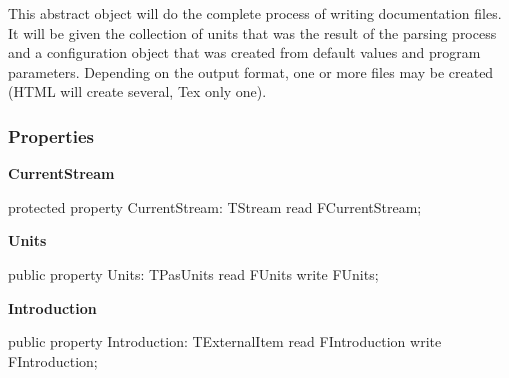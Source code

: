 \documentclass{report}
\newif\ifpdf
\begin{document}
 This abstract object will do the complete process of writing documentation files. It will be given the collection of units that was the result of the parsing process and a configuration object that was created from default values and program parameters. Depending on the output format, one or more files may be created (HTML will create several, Tex only one).\subsubsection*{\large{\textbf{Properties}}\normalsize\hspace{1ex}\hfill}
\begin{list}{}{
\setlength{\itemindent}{0cm}
\setlength{\listparindent}{0cm}
\setlength{\leftmargin}{\evensidemargin}
\addtolength{\leftmargin}{\tmplength}
\settowidth{\labelsep}{X}
\addtolength{\leftmargin}{\labelsep}
\setlength{\labelwidth}{\tmplength}
}
\label{PasDoc_Gen.TDocGenerator-CurrentStream}
\item[\textbf{CurrentStream}\hfill]
\ifpdf
\begin{flushleft}
\fi
\begin{ttfamily}
protected property CurrentStream: TStream read FCurrentStream;\end{ttfamily}

\ifpdf
\end{flushleft}
\fi


\par  \label{PasDoc_Gen.TDocGenerator-Units}
\item[\textbf{Units}\hfill]
\ifpdf
\begin{flushleft}
\fi
\begin{ttfamily}
public property Units: TPasUnits read FUnits write FUnits;\end{ttfamily}

\ifpdf
\end{flushleft}
\fi


\par  \label{PasDoc_Gen.TDocGenerator-Introduction}
\item[\textbf{Introduction}\hfill]
\ifpdf
\begin{flushleft}
\fi
\begin{ttfamily}
public property Introduction: TExternalItem read FIntroduction
      write FIntroduction;\end{ttfamily}

\ifpdf
\end{flushleft}
\fi



\end{list}
\end{document}
